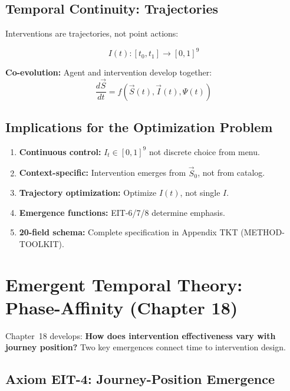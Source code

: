 \subsection{Temporal Continuity: Trajectories}

Interventions are trajectories, not point actions:

\begin{equation}
I(t): [t_0, t_1] \to [0,1]^9
\label{eq:mp-trajectory}
\end{equation}

\textbf{Co-evolution:} Agent and intervention develop together:
\begin{equation}
\frac{d\vec{S}}{dt} = f(\vec{S}(t), \vec{I}(t), \Psi(t))
\label{eq:mp-coevolution}
\end{equation}

\subsection{Implications for the Optimization Problem}

\begin{enumerate}[nosep]
\item \textbf{Continuous control:} $I_t \in [0,1]^9$ not discrete choice from menu.
\item \textbf{Context-specific:} Intervention emerges from $\vec{S}_0$, not from catalog.
\item \textbf{Trajectory optimization:} Optimize $I(t)$, not single $I$.
\item \textbf{Emergence functions:} EIT-6/7/8 determine emphasis.
\item \textbf{20-field schema:} Complete specification in Appendix TKT (METHOD-TOOLKIT).
\end{enumerate}

\section{Emergent Temporal Theory: Phase-Affinity (Chapter 18)}
\label{sec:mp-temporal}

Chapter~18 develops: \textbf{How does intervention effectiveness vary with journey position?} Two key emergences connect time to intervention design.

\subsection{Axiom EIT-4: Journey-Position Emergence}

